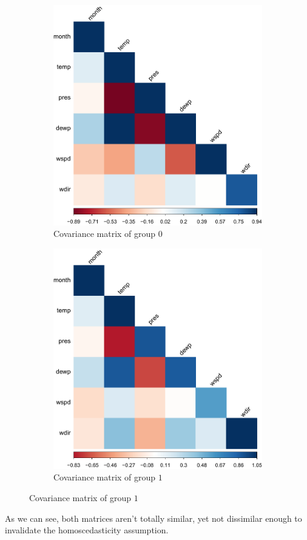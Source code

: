 \documentclass[a4paper, 12pt]{article}
\begin{document}
    \begin{figure}[h]
        \centering
        \begin{subfigure}{0.48\textwidth}
            \includegraphics[width = \textwidth]{resources/pdf/cov_group_false.pdf}
            \caption{Covariance matrix of group $0$}
        \end{subfigure}
        \hspace{0.5em}
        \begin{subfigure}{0.48\textwidth}
            \includegraphics[width=\textwidth]{resources/pdf/cov_group_true.pdf}
            \caption{Covariance matrix of group $1$}
        \end{subfigure}
    \end{figure}
    
    As we can see, both matrices aren't totally similar, yet not dissimilar enough to invalidate the homoscedasticity assumption.
    
\end{document}
